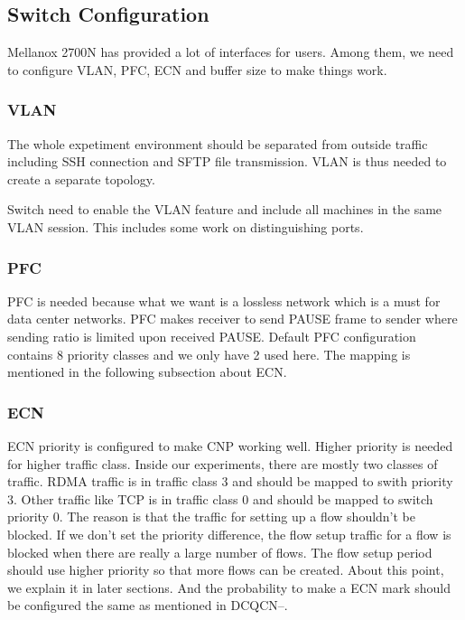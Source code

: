 \documentclass[12pt,a4paper]{article}
\begin{document}
\subsection{Switch Configuration}

Mellanox 2700N has provided a lot of interfaces for users. Among them, we need to configure VLAN, PFC, ECN and buffer size to make things work.

\subsubsection{VLAN}
The whole expetiment environment should be separated from outside traffic including SSH connection and SFTP file transmission.
VLAN is thus needed to create a separate topology.

Switch need to enable the VLAN feature and include all machines in the same VLAN session.
This includes some work on distinguishing ports.

\subsubsection{PFC}
PFC is needed because what we want is a lossless network which is a must for data center networks.
PFC makes receiver to send PAUSE frame to sender where sending ratio is limited upon received PAUSE.
Default PFC configuration contains 8 priority classes and we only have 2 used here.
The mapping is mentioned in the following subsection about ECN.

\subsubsection{ECN}
ECN priority is configured to make CNP working well. Higher priority is needed for higher traffic class.
Inside our experiments, there are mostly two classes of traffic. RDMA traffic is in traffic class 3 and should be mapped to swith priority 3.
Other traffic like TCP is in traffic class 0 and should be mapped to switch priority 0.
The reason is that the traffic for setting up a flow shouldn't be blocked. If we don't set the priority difference, the flow setup traffic for a flow
is blocked when there are really a large number of flows. The flow setup period should use higher priority so that more flows can be created.
About this point, we explain it in later sections.
And the probability to make a ECN mark should be configured the same as mentioned in DCQCN--.
\end{document}
